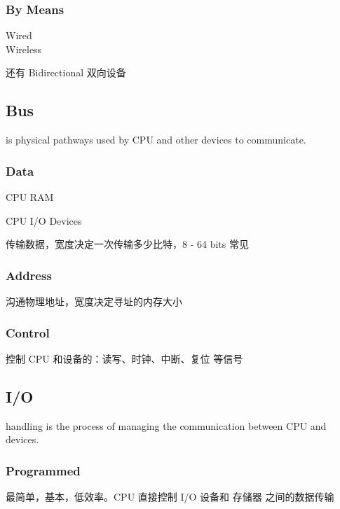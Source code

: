 \documentclass[11pt,journal,compsoc]{IEEEtran}
\begin{document}
\subsubsection{By Means}

\begin{description}
    \item[Wired]
    \item[Wireless]
\end{description}

还有 Bidirectional 双向设备


\subsection{Bus}

is physical pathways used by CPU and other devices to communicate.


\subsubsection{Data}

CPU \leftrightarrow RAM

CPU \leftrightarrow I/O Devices

传输数据，宽度决定一次传输多少比特，8 - 64 bits 常见


\subsubsection{Address}

沟通物理地址，宽度决定寻址的内存大小


\subsubsection{Control}

控制 CPU 和设备的：读写、时钟、中断、复位 等信号


\subsection{I/O}

handling is the process of managing the communication between CPU and devices.


\subsubsection{Programmed}

最简单，基本，低效率。CPU 直接控制 I/O 设备和 存储器 之间的数据传输
\end{document}
